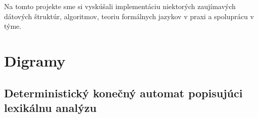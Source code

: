 \documentclass[a4paper, 11pt]{article}
\begin{document}
    Na tomto projekte sme si vyskúšali implementáciu niektorých zaujímavých dátových štruktúr, algoritmov, teoriu formálnych jazykov v praxi a spoluprácu v týme.
    
    \clearpage
    
    \section{Digramy}
    \subsection{Deterministický konečný automat popisujúci lexikálnu analýzu}
    \begin{figure}[h]
		\centering
	\end{figure}
\end{document}
